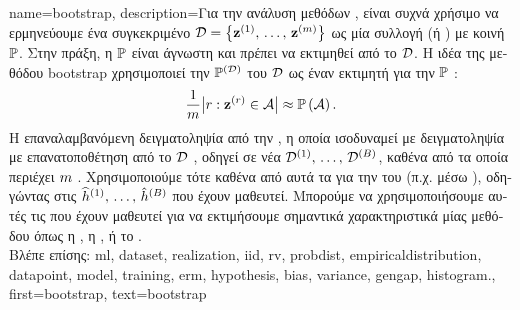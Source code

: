 {name={bootstrap},
	description={\foreignlanguage{greek}{Για την ανάλυση μεθόδων} 
		, \foreignlanguage{greek}{είναι συχνά χρήσιμο να ερμηνεύουμε ένα συγκεκριμένο}  
		 $\mathcal{D} = \big\{ {\bf z}^{(1)}, \,\ldots, \,{\bf z}^{(m)}\big\}$ \foreignlanguage{greek}{ως μία 
		συλλογή}   (\foreignlanguage{greek}{ή}   )
		\foreignlanguage{greek}{με κοινή}  $\mathbb{P}$. 
		\foreignlanguage{greek}{Στην πράξη, η}  $\mathbb{P}$ \foreignlanguage{greek}{είναι άγνωστη και 
		πρέπει να εκτιμηθεί από το $\mathcal{D}$. Η ιδέα της μεθόδου} bootstrap \foreignlanguage{greek}{χρησιμοποιεί 
		την}  $\mathbb{P}^{(\mathcal{D})}$ \foreignlanguage{greek}{του $\mathcal{D}$ ως έναν εκτιμητή για την} 
		$\mathbb{P}$ \cite{hastie01statisticallearning}:
		$$ \frac{1}{m} \big| r: {\bf z}^{(r)} \in \mathcal{A} \big| \approx \mathbb{P}\left(\mathcal{A}\right).$$
		\foreignlanguage{greek}{Η επαναλαμβανόμενη δειγματοληψία από την} , \foreignlanguage{greek}{η 
		οποία ισοδυναμεί με δειγματοληψία με επανατοποθέτηση από το} $\mathcal{D}$ \cite{BoostrapBook}, 
		\foreignlanguage{greek}{οδηγεί σε νέα}  $\mathcal{D}^{(1)}, \,\ldots, \,\mathcal{D}^{(B)}$, 
		\foreignlanguage{greek}{καθένα από τα οποία περιέχει} $m$ . \foreignlanguage{greek}{Χρησιμοποιούμε 
		τότε καθένα από αυτά τα}  \foreignlanguage{greek}{για την}  \foreignlanguage{greek}{του} 
		 \foreignlanguage{greek}{(π.χ. μέσω} ), \foreignlanguage{greek}{οδηγώντας στις}
		 $\widehat{h}^{(1)}, \,\ldots, \,\hat{h}^{(B)}$ \foreignlanguage{greek}{που έχουν 
		μαθευτεί. Μπορούμε να χρησιμοποιήσουμε αυτές τις}  \foreignlanguage{greek}{που έχουν μαθευτεί για 
		να εκτιμήσουμε σημαντικά χαρακτηριστικά μίας μεθόδου}  \foreignlanguage{greek}{όπως η} , 
		\foreignlanguage{greek}{η} , \foreignlanguage{greek}{ή το}  \cite{hastie01statisticallearning}.
		\\
		\foreignlanguage{greek}{Βλέπε επίσης:} \gls{ml}, \gls{dataset}, \gls{realization}, \gls{iid}, \gls{rv}, \gls{probdist}, \gls{empiricaldistribution},
		\gls{datapoint}, \gls{model}, \gls{training}, \gls{erm}, \gls{hypothesis}, \gls{bias}, \gls{variance}, \gls{gengap}, \gls{histogram}.},
	first={bootstrap},
	text={bootstrap}
}%

